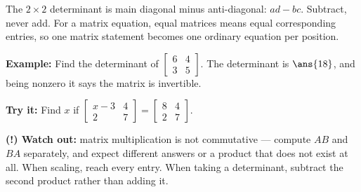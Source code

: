 \documentclass[12pt]{article}
\begin{document}

\begin{formulabox}
The $2 \times 2$ determinant is main diagonal minus anti-diagonal: $ad - bc$.
Subtract, never add. For a matrix equation, equal matrices means equal
corresponding entries, so one matrix statement becomes one ordinary equation
per position.
\end{formulabox}

\begin{examplebox}
\textbf{Example:} Find the determinant of
$\left[\begin{smallmatrix} 6 & 4 \\ 3 & 5 \end{smallmatrix}\right]$.
The determinant is $\ans{18}$, and being nonzero it says the matrix is
invertible.
\end{examplebox}

\begin{tryitbox}
\textbf{Try it:} Find $x$ if
$\left[\begin{smallmatrix} x - 3 & 4 \\ 2 & 7 \end{smallmatrix}\right] =
\left[\begin{smallmatrix} 8 & 4 \\ 2 & 7 \end{smallmatrix}\right]$.\\[2pt]
\end{tryitbox}

\begin{watchoutbox}
\textbf{(!) Watch out:} matrix multiplication is not commutative --- compute
$AB$ and $BA$ separately, and expect different answers or a product that does
not exist at all. When scaling, reach every entry. When taking a determinant,
subtract the second product rather than adding it.
\end{watchoutbox}
\end{document}
